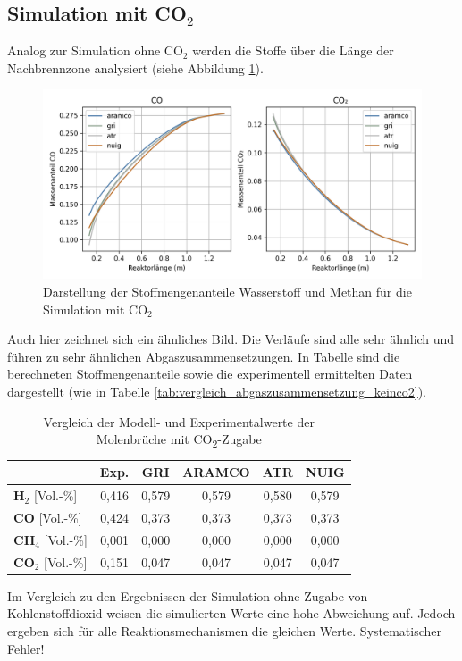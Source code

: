         \subsection{Simulation mit CO$_2$}
        Analog zur Simulation ohne CO$_2$ werden die Stoffe über die Länge der Nachbrennzone analysiert (siehe Abbildung \ref{fig:vergleich_h2_ch4_co2}).
        \begin{figure}[H]
            \centering
            \includegraphics[width=1\linewidth]{img/Vergleich_mech/CO_CO2_CO2.png}
            \caption{Darstellung der Stoffmengenanteile Wasserstoff und Methan für die Simulation mit CO$_2$}
            \label{fig:vergleich_h2_ch4_co2}
        \end{figure}
        Auch hier zeichnet sich ein ähnliches Bild. Die Verläufe sind alle sehr ähnlich und führen zu sehr ähnlichen Abgaszusammensetzungen. In Tabelle sind die berechneten Stoffmengenanteile sowie die experimentell ermittelten Daten dargestellt (wie in Tabelle \ref{tab:vergleich_abgaszusammensetzung_keinco2}).
        \begin{table}[H]
            \centering
            \caption{Vergleich der Modell- und Experimentalwerte der Molenbrüche mit CO\textsubscript{2}-Zugabe}
            \begin{tabular}{lccccc}
                \toprule
                & \textbf{Exp.} & \textbf{GRI} & \textbf{ARAMCO} & \textbf{ATR} & \textbf{NUIG} \\
                \midrule
                \textbf{H$_2$} [Vol.-\%]& 0,416 & 0,579 & 0,579 & 0,580 & 0,579 \\
                \textbf{CO} [Vol.-\%]& 0,424 & 0,373 & 0,373 & 0,373 & 0,373 \\
                \textbf{CH$_4$} [Vol.-\%]& 0,001 & 0,000 & 0,000 & 0,000 & 0,000 \\
                \textbf{CO$_2$} [Vol.-\%]& 0,151 & 0,047 & 0,047 & 0,047 & 0,047 \\
                \bottomrule
            \end{tabular}
        \end{table}
        Im Vergleich zu den Ergebnissen der Simulation ohne Zugabe von Kohlenstoffdioxid weisen die simulierten Werte eine hohe Abweichung auf. Jedoch ergeben sich für alle Reaktionsmechanismen die gleichen Werte. \alert{Systematischer Fehler!}
\fi 